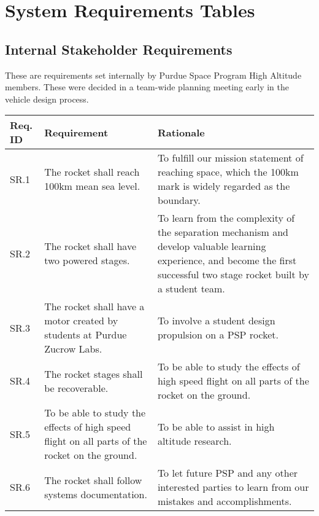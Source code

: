 \section{System Requirements Tables}
\subsection{Internal Stakeholder Requirements}
These are requirements set internally by Purdue Space Program High Altitude members. These were decided in a team-wide planning meeting early in the vehicle design process.

\begin{table}[htbp]
    \footnotesize 
    \setlength{\tymin}{40pt}
    \let\raggedright\RaggedRight
    
    \begin{tabulary}{\textwidth}{@{}LLL@{}}
    \toprule
        \textbf{Req. ID} & \textbf{Requirement} & \textbf{Rationale} \\
    \midrule
        SR.1 & The rocket shall reach 100km mean sea level. & To fulfill our mission statement of reaching space, which the 100km mark is widely regarded as the boundary. \\ 
        SR.2 & The rocket shall have two powered stages. & To learn from the complexity of the separation mechanism and develop valuable learning experience, and become the first successful two stage rocket built by a student team. \\ 
        SR.3 & The rocket shall have a motor created by students at Purdue Zucrow Labs. & To involve a student design propulsion on a PSP rocket. \\
        SR.4 & The rocket stages shall be recoverable. & To be able to study the effects of high speed flight on all parts of the rocket on the ground. \\
        SR.5 & To be able to study the effects of high speed flight on all parts of the rocket on the ground. & To be able to assist in high altitude research. \\
        SR.6 & The rocket shall follow systems documentation. & To let future PSP and any other interested parties to learn from our mistakes and accomplishments. \\
    \bottomrule
    \end{tabulary}

    \label{table:internal-stakeholder}
\end{table}



